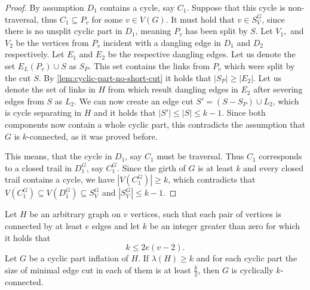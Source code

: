 \documentclass[12pt, twoside]{book}
\begin{document}
\begin{proof}
	By assumption $D_1$ contains a cycle, say $C_1$. Suppose that this cycle is non-traversal, thus $C_1\subseteq P_v$ for some $v\in V(G)$. It must hold that $v\in S_V^G$, since there is no unsplit cyclic part in $D_1$, meaning $P_v$ has been split by $S$. Let $V_1,$ and $V_2$ be the vertices from $P_v$ incident with a dangling edge in $D_1$ and $D_2$ respectively. Let $E_1$ and $E_2$ be the respective dangling edges. Let us denote the set $E_L(P_v)\cup S$ as $S_P$. This set contains the links from $P_v$ which were split by the cut $S$. By \cref{lem:cyclic-part-no-short-cut} it holds that $|S_P|\geq|E_2|$. Let us denote the set of links in $H$ from which result dangling edges in $E_2$ after severing edges from $S$ as $L_2$. We can now create an edge cut $S'=(S-S_P)\cup L_2$, which is cycle separating in $H$ and it holds that $|S'|\leq |S|\leq k-1$. Since both components now contain a whole cyclic part, this contradicts the assumption that $G$ is $k$-connected, as it was proved before.
	
	This means, that the cycle in $D_1$, say $C_1$ must be traversal. Thus $C_1$ corresponds to a closed trail in $D_1^G$, say $C_1^G$. Since the girth of $G$ is at least $k$ and every closed trail contains a cycle, we have $|V(C_1^G)|\geq k$, which contradicts that $V(C_1^G)\subseteq V(D_1^G)\subseteq S_V^G$ and $|S_V^G|\leq k-1$.
\end{proof}

\begin{theorem}\label{th:cyclic-part-inflation-kve}
	Let $H$ be an arbitrary graph on $v$ vertices, such that each pair of vertices is connected by at least $e$ edges and let $k$ be an integer greater than zero for which it holds that
	$$k\leq 2e(v-2).$$
	Let $G$ be a cyclic part inflation of $H$. If $\lambda(H)\geq k$ and for each cyclic part the size of minimal edge cut in each of them is at least $\frac{k}{2}$, then $G$ is cyclically $k$-connected.
\end{theorem}
\end{document}
